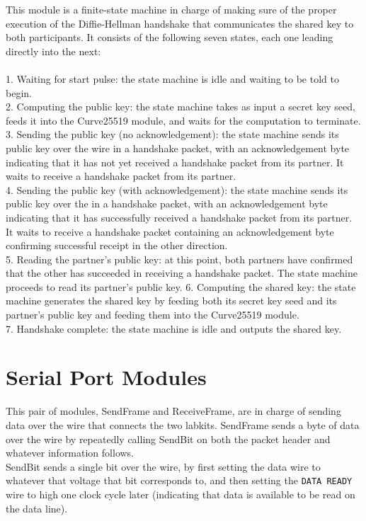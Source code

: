 \documentclass[a4paper]{report}
\begin{document}
This module is a finite-state machine in charge of making sure of the proper execution of the Diffie-Hellman handshake that communicates the shared key to both participants. It consists of the following seven states, each one leading directly into the next: \\ \\
1. Waiting for start pulse: the state machine is idle and waiting to be told to begin. \\
2. Computing the public key: the state machine takes as input a secret key seed, feeds it into the Curve25519 module, and waits for the computation to terminate. \\
3. Sending the public key (no acknowledgement): the state machine sends its public key over the wire in a handshake packet, with an acknowledgement byte indicating that it has not yet received a handshake packet from its partner. It waits to receive a handshake packet from its partner. \\
4. Sending the public key (with acknowledgement): the state machine sends its public key over the in a handshake packet, with an acknowledgement byte indicating that it has successfully received a handshake packet from its partner. It waits to receive a handshake packet containing an acknowledgement byte confirming successful receipt in the other direction. \\
5. Reading the partner's public key: at this point, both partners have confirmed that the other has succeeded in receiving a handshake packet. The state machine proceeds to read its partner's public key. 
6. Computing the shared key: the state machine generates the shared key by feeding both its secret key seed and its partner's public key and feeding them into the Curve25519 module. \\
7. Handshake complete: the state machine is idle and outputs the shared key. \\

\section{Serial Port Modules}

This pair of modules, SendFrame and ReceiveFrame, are in charge of sending data over the wire that connects the two labkits. SendFrame sends a byte of data over the wire by repeatedly calling SendBit on both the packet header and whatever information follows. \\

SendBit sends a single bit over the wire, by first setting the data wire to whatever that voltage that bit corresponds to, and then setting the \verb|DATA READY| wire to high one clock cycle later (indicating that data is available to be read on the data line). \\
\end{document}
